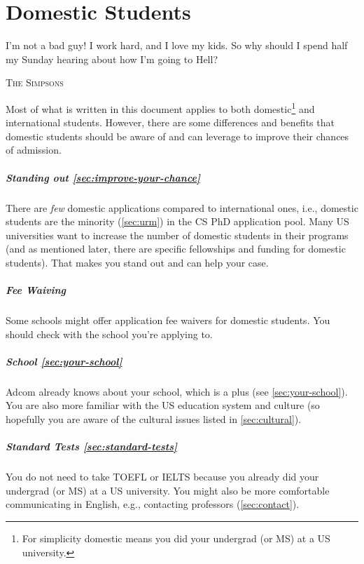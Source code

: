 \documentclass[oneside,11pt,dvipsnames]{book}
\def\chapterinfo#1{%
  \addcontentsline{toc}{chapterinfo}{%
    \noexpand\numberline{}\color{black}{#1}}%
}
\begin{document}
\chapter{Domestic Students}\label{sec:domestic-students}
\chapterinfo{Specific benefits and opportunities for domestic students applying to CS PhD programs.}

\epigraph{\vspace{-0.2in} I’m not a bad guy! I work hard, and I love my kids. So why should I spend half my Sunday hearing about how I’m going to Hell?}{\textsc{The Simpsons}}

Most of what is written in this document applies to both domestic\footnote{For simplicity domestic means you did your undergrad (or MS) at a US university.} and international students.  However, there are some differences and benefits that domestic students should be aware of and can leverage to improve their chances of admission.

\paragraph{Standing out \autoref{sec:improve-your-chance}} There are \emph{few} domestic applications compared to international ones, i.e., domestic students are the minority (\autoref{sec:urm}) in the CS PhD application pool. Many US universities want to increase the number of domestic students in their programs (and as mentioned later, there are specific fellowships and funding for domestic students).
That makes you stand out and can help your case.

\paragraph{Fee Waiving} Some schools might offer application fee waivers for domestic students.  You should check with the school you're applying to.

\paragraph{School \autoref{sec:your-school}} Adcom already knows about your school, which is a plus (see \autoref{sec:your-school}). You are also more familiar with the US education system and culture (so hopefully you are aware of the cultural issues listed in \autoref{sec:cultural}).

\paragraph{Standard Tests \autoref{sec:standard-tests}} You do not need to take TOEFL or IELTS because you already did your undergrad (or MS) at a US university.  You might also be more comfortable communicating in English, e.g., contacting professors (\autoref{sec:contact}).
\end{document}

